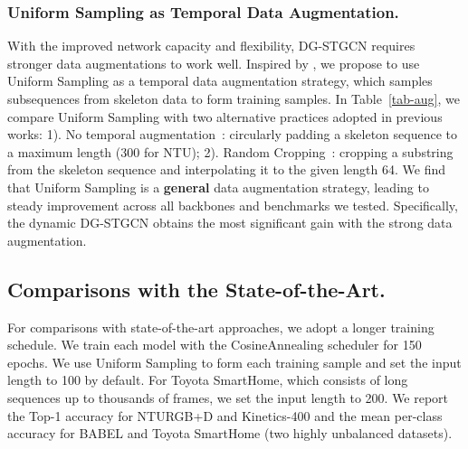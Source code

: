 \vspace{-5mm}
\subsubsection{Uniform Sampling as Temporal Data Augmentation. }
With the improved network capacity and flexibility, DG-STGCN requires stronger data augmentations to work well.
Inspired by \cite{duan2021revisiting}, we propose to use Uniform Sampling as a temporal data augmentation strategy, which samples subsequences from skeleton data to form training samples. 
In Table~\ref{tab-aug}, we compare Uniform Sampling with two alternative practices adopted in previous works: 
1). No temporal augmentation~\cite{liu2020disentangling,shi2019two}: circularly padding a skeleton sequence to a maximum length (300 for NTU); 
2). Random Cropping~\cite{chen2021channel}: cropping a substring from the skeleton sequence and interpolating it to the given length 64. 
We find that Uniform Sampling is a \textbf{general} data augmentation strategy, leading to steady improvement across all backbones and benchmarks we tested. 
Specifically, the dynamic DG-STGCN obtains the most significant gain with the strong data augmentation.

\vspace{-3mm}
\subsection{Comparisons with the State-of-the-Art. }
For comparisons with state-of-the-art approaches, we adopt a longer training schedule. 
We train each model with the CosineAnnealing scheduler for 150 epochs. 
We use Uniform Sampling to form each training sample and set the input length to 100 by default.
For Toyota SmartHome, which consists of long sequences up to thousands of frames, we set the input length to 200.
We report the Top-1 accuracy for NTURGB+D and Kinetics-400 and the mean per-class accuracy for BABEL and Toyota SmartHome (two highly unbalanced datasets).

